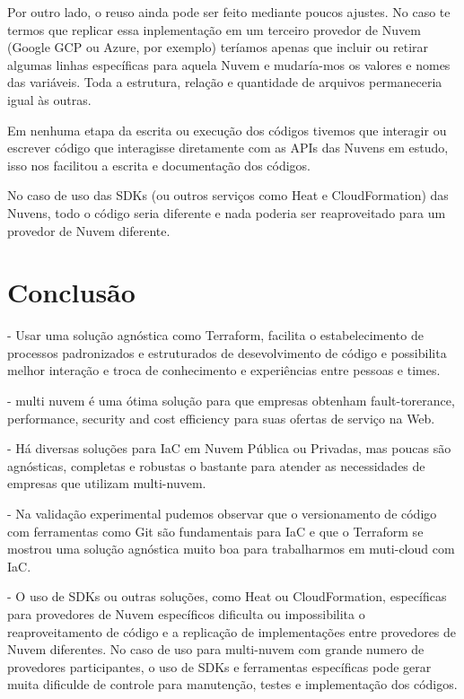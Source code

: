 \documentclass[12pt]{article}
\begin{document}
	Por outro lado, o reuso ainda pode ser feito mediante poucos ajustes. No caso te termos que replicar essa inplementação em um terceiro provedor de Nuvem (Google GCP ou Azure, por exemplo) teríamos apenas que incluir ou retirar algumas linhas específicas para aquela Nuvem e mudaría-mos os valores e nomes das variáveis. Toda a estrutura, relação e quantidade de arquivos permaneceria igual às outras. 
	
	Em nenhuma etapa da escrita ou execução dos códigos tivemos que interagir ou escrever código que interagisse diretamente com as APIs das Nuvens em estudo, isso nos facilitou a escrita e documentação dos códigos.
	
	No caso de uso das SDKs (ou outros serviços como Heat e CloudFormation) das Nuvens, todo o código seria diferente e nada poderia ser reaproveitado para um provedor de Nuvem diferente. 		
	
	\section{Conclusão}
	
	- Usar uma solução agnóstica como Terraform, facilita o estabelecimento de processos padronizados e estruturados de desevolvimento de código e possibilita melhor interação e troca de conhecimento e experiências entre pessoas e times.
	
	- multi nuvem é uma ótima solução para que empresas obtenham fault-torerance, performance, security and cost efficiency para suas ofertas de serviço na Web.
	
	- Há diversas soluções para IaC em Nuvem Pública ou Privadas, mas poucas são agnósticas, completas e robustas o bastante para atender as necessidades de empresas que utilizam multi-nuvem.
	
	- Na validação experimental pudemos observar que o versionamento de código com ferramentas como Git são fundamentais para IaC e que o Terraform se mostrou uma solução agnóstica muito boa para trabalharmos em muti-cloud com IaC.
	
	- O uso de SDKs ou outras soluções, como Heat ou CloudFormation, específicas para provedores de Nuvem específicos dificulta ou impossibilita o reaproveitamento de código e a replicação de implementações entre provedores de Nuvem diferentes. No caso de uso para multi-nuvem com grande numero de provedores participantes, o uso de SDKs e ferramentas específicas pode gerar muita dificulde de controle para manutenção, testes e implementação dos códigos.
	
\end{document}
